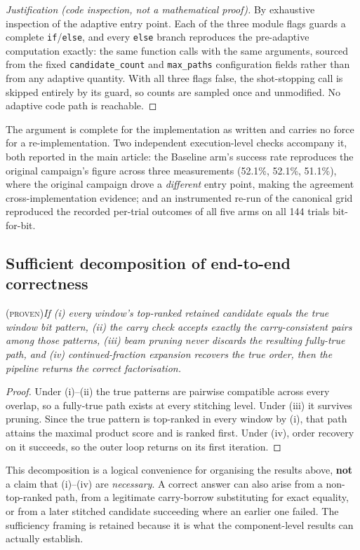 \documentclass[preprint,11pt]{elsarticle}
\newcommand{\PROVEN}{\textsc{(proven)}}
\begin{document}
\begin{proof}[Justification (code inspection, not a mathematical proof)]
By exhaustive inspection of the adaptive entry point. Each of the three
module flags guards a complete \texttt{if}/\texttt{else}, and every
\texttt{else} branch reproduces the pre-adaptive computation exactly:
the same function calls with the same arguments, sourced from the fixed
\texttt{candidate\_count} and \texttt{max\_paths} configuration fields
rather than from any adaptive quantity. With all three flags false, the
shot-stopping call is skipped entirely by its guard, so counts are
sampled once and unmodified. No adaptive code path is reachable.
\end{proof}

\noindent
The argument is complete for the implementation as written and carries no
force for a re-implementation. Two independent execution-level checks
accompany it, both reported in the main article: the Baseline arm's
success rate reproduces the original campaign's figure across three
measurements (52.1\%, 52.1\%, 51.1\%), where the original campaign drove
a \emph{different} entry point, making the agreement cross-implementation
evidence; and an instrumented re-run of the canonical grid reproduced the
recorded per-trial outcomes of all five arms on all 144 trials
bit-for-bit.

\subsection{Sufficient decomposition of end-to-end correctness}
\PROVEN{}\quad\textit{If (i) every window's top-ranked retained candidate
equals the true window bit pattern, (ii) the carry check accepts exactly
the carry-consistent pairs among those patterns, (iii) beam pruning never
discards the resulting fully-true path, and (iv) continued-fraction
expansion recovers the true order, then the pipeline returns the correct
factorisation.}

\begin{proof}
Under (i)--(ii) the true patterns are pairwise compatible across every
overlap, so a fully-true path exists at every stitching level. Under
(iii) it survives pruning. Since the true pattern is top-ranked in every
window by (i), that path attains the maximal product score and is ranked
first. Under (iv), order recovery on it succeeds, so the outer loop
returns on its first iteration.
\end{proof}

\noindent
This decomposition is a logical convenience for organising the results
above, \textbf{not} a claim that (i)--(iv) are \emph{necessary}. A correct
answer can also arise from a non-top-ranked path, from a legitimate
carry-borrow substituting for exact equality, or from a later stitched
candidate succeeding where an earlier one failed. The sufficiency framing
is retained because it is what the component-level results can actually
establish.
\end{document}
